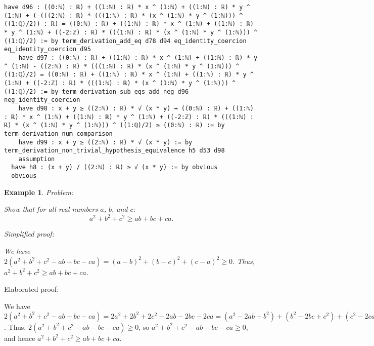\documentclass{article}
\newtheorem{example}{Example}
\begin{document}
\begin{tcolorbox}[colback=white!10, width=\linewidth]
\begin{lstlisting}[language=Lean4]
    have d96 : ((0:ℕ) : ℝ) + ((1:ℕ) : ℝ) * x ^ (1:ℕ) + ((1:ℕ) : ℝ) * y ^ (1:ℕ) + (-(((2:ℕ) : ℝ) * (((1:ℕ) : ℝ) * (x ^ (1:ℕ) * y ^ (1:ℕ))) ^ ((1:ℚ)/2)) : ℝ) = ((0:ℕ) : ℝ) + ((1:ℕ) : ℝ) * x ^ (1:ℕ) + ((1:ℕ) : ℝ) * y ^ (1:ℕ) + ((-2:ℤ) : ℝ) * (((1:ℕ) : ℝ) * (x ^ (1:ℕ) * y ^ (1:ℕ))) ^ ((1:ℚ)/2) := by term_derivation_add_eq d78 d94 eq_identity_coercion eq_identity_coercion d95
    have d97 : ((0:ℕ) : ℝ) + ((1:ℕ) : ℝ) * x ^ (1:ℕ) + ((1:ℕ) : ℝ) * y ^ (1:ℕ) - ((2:ℕ) : ℝ) * (((1:ℕ) : ℝ) * (x ^ (1:ℕ) * y ^ (1:ℕ))) ^ ((1:ℚ)/2) = ((0:ℕ) : ℝ) + ((1:ℕ) : ℝ) * x ^ (1:ℕ) + ((1:ℕ) : ℝ) * y ^ (1:ℕ) + ((-2:ℤ) : ℝ) * (((1:ℕ) : ℝ) * (x ^ (1:ℕ) * y ^ (1:ℕ))) ^ ((1:ℚ)/2) := by term_derivation_sub_eqs_add_neg d96 neg_identity_coercion
    have d98 : x + y ≥ ((2:ℕ) : ℝ) * √ (x * y) ↔ ((0:ℕ) : ℝ) + ((1:ℕ) : ℝ) * x ^ (1:ℕ) + ((1:ℕ) : ℝ) * y ^ (1:ℕ) + ((-2:ℤ) : ℝ) * (((1:ℕ) : ℝ) * (x ^ (1:ℕ) * y ^ (1:ℕ))) ^ ((1:ℚ)/2) ≥ ((0:ℕ) : ℝ) := by term_derivation_num_comparison
    have d99 : x + y ≥ ((2:ℕ) : ℝ) * √ (x * y) := by term_derivation_non_trivial_hypothesis_equivalence h5 d53 d98
    assumption
  have h8 : (x + y) / ((2:ℕ) : ℝ) ≥ √ (x * y) := by obvious
  obvious

\end{lstlisting}
\end{tcolorbox}


\begin{example}
Problem:
\begin{tcolorbox}[colback=yellow!10, width=\linewidth]
Show that for all real numbers $a$, $b$, and $c$:
    $$a^2 + b^2 + c^2 \geq ab + bc + ca.$$
\end{tcolorbox}

Simplified proof:
\begin{tcolorbox}[colback=blue!10, width=\linewidth]
We have $2(a^2 + b^2 + c^2 - ab - bc - ca) = (a-b)^2 + (b-c)^2 + (c-a)^2 \ge 0$. Thus, $a^2 + b^2 + c^2 \geq ab + bc + ca$.
\end{tcolorbox}
\end{example}

Elaborated proof:
\begin{tcolorbox}[colback=green!10, width=\linewidth]
We have $2(a^2 + b^2 + c^2 - ab - bc - ca) = 2a^2 + 2b^2 + 2c^2 - 2ab - 2bc - 2ca = (a^2 - 2ab + b^2) + (b^2 - 2bc + c^2) + (c^2 - 2ca + a^2) = (a-b)^2 + (b-c)^2 + (c-a)^2 \ge 0$. Thus, $2(a^2 + b^2 + c^2 - ab - bc - ca) \ge 0$, so $a^2 + b^2 + c^2 - ab - bc - ca \ge 0$, and hence $a^2 + b^2 + c^2 \geq ab + bc + ca$.
\end{tcolorbox}
\end{document}

